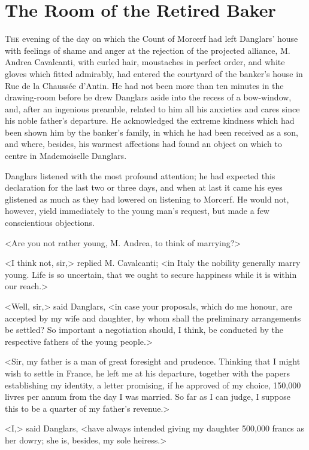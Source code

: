 \chapter{The Room of the Retired Baker} 

 \lettrine{T}{he} evening of the day on which the Count of Morcerf had left Danglars' house with feelings of shame and anger at the rejection of the projected alliance, M. Andrea Cavalcanti, with curled hair, moustaches in perfect order, and white gloves which fitted admirably, had entered the courtyard of the banker's house in Rue de la Chaussée d'Antin. He had not been more than ten minutes in the drawing-room before he drew Danglars aside into the recess of a bow-window, and, after an ingenious preamble, related to him all his anxieties and cares since his noble father's departure. He acknowledged the extreme kindness which had been shown him by the banker's family, in which he had been received as a son, and where, besides, his warmest affections had found an object on which to centre in Mademoiselle Danglars. 

 Danglars listened with the most profound attention; he had expected this declaration for the last two or three days, and when at last it came his eyes glistened as much as they had lowered on listening to Morcerf. He would not, however, yield immediately to the young man's request, but made a few conscientious objections. 

 <Are you not rather young, M. Andrea, to think of marrying?> 

 <I think not, sir,> replied M. Cavalcanti; <in Italy the nobility generally marry young. Life is so uncertain, that we ought to secure happiness while it is within our reach.> 

 <Well, sir,> said Danglars, <in case your proposals, which do me honour, are accepted by my wife and daughter, by whom shall the preliminary arrangements be settled? So important a negotiation should, I think, be conducted by the respective fathers of the young people.> 

 <Sir, my father is a man of great foresight and prudence. Thinking that I might wish to settle in France, he left me at his departure, together with the papers establishing my identity, a letter promising, if he approved of my choice, 150,000 livres per annum from the day I was married. So far as I can judge, I suppose this to be a quarter of my father's revenue.> 

 <I,> said Danglars, <have always intended giving my daughter 500,000 francs as her dowry; she is, besides, my sole heiress.> 

